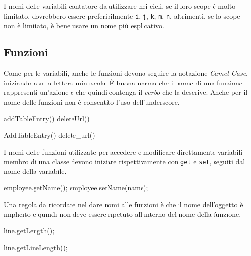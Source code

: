 I nomi delle variabili contatore da utilizzare nei cicli, se il loro scope è molto limitato, dovrebbero essere preferibilmente \texttt{i}, \texttt{j}, \texttt{k}, \texttt{m}, \texttt{n}, altrimenti, se lo scope non è limitato, è bene usare un nome più esplicativo.

\subsection{Funzioni}\label{ssec:functionname}

Come per le variabili, anche le funzioni devono seguire la notazione \emph{Camel Case}, iniziando con la lettera minuscola\cite{codestyle:geotechnical}.
È buona norma che il nome di una funzione rappresenti un'azione e che quindi contenga il \emph{verbo} che la descrive.
Anche per il nome delle funzioni non è consentito l'uso dell'underscore.    

\begin{minipage}[t]{\cbwidth}
\begin{RightCode}
addTableEntry()
deleteUrl()
\end{RightCode}
\end{minipage}%
\hspace{\cbdistance}
\begin{minipage}[t]{\cbwidth}
\begin{ErrorCode}
AddTableEntry()
delete_url()
\end{ErrorCode}
\end{minipage}

I nomi delle funzioni utilizzate per accedere e modificare direttamente variabili membro di una classe devono iniziare rispettivamente con \texttt{get} e \texttt{set}, seguiti dal nome della variabile.

\begin{minipage}[t]{\rbwidth}
\begin{RightCode}
employee.getName();
employee.setName(name);
\end{RightCode}
\end{minipage}%

Una regola da ricordare nel dare nomi alle funzioni è che il nome dell'oggetto è implicito e quindi non deve essere ripetuto all'interno del nome della funzione.

\begin{minipage}[t]{\cbwidth}
\begin{RightCode}
line.getLength();
\end{RightCode}
\end{minipage}%
\hspace{\cbdistance}
\begin{minipage}[t]{\cbwidth}
\begin{ErrorCode}
line.getLineLength();
\end{ErrorCode}
\end{minipage}

